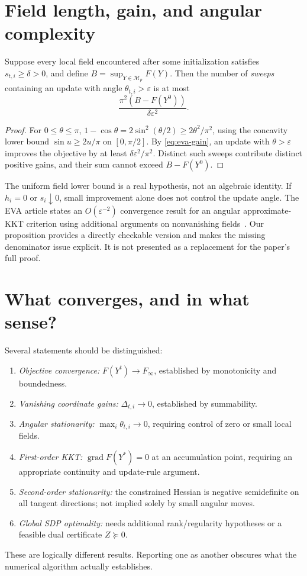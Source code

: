 \section{Field length, gain, and angular complexity}
\begin{proposition}\label{prop:conditional-rate}
Suppose every local field encountered after some initialization satisfies $s_{t,i}\ge\delta>0$, and define $B=\sup_{Y\in\mathcal M_p}F(Y)$. Then the number of \emph{sweeps} containing an update with angle $\theta_{t,i}>\varepsilon$ is at most
\[
\frac{\pi^2(B-F(Y^0))}{\delta\varepsilon^2}.
\]
\end{proposition}
\begin{proof}
For $0\le\theta\le\pi$, $1-\cos\theta=2\sin^2(\theta/2)\ge2\theta^2/\pi^2$, using the concavity lower bound $\sin u\ge2u/\pi$ on $[0,\pi/2]$. By \eqref{eq:eva-gain}, an update with $\theta>\varepsilon$ improves the objective by at least $\delta\varepsilon^2/\pi^2$. Distinct such sweeps contribute distinct positive gains, and their sum cannot exceed $B-F(Y^0)$.
\end{proof}

\begin{caution}
The uniform field lower bound is a real hypothesis, not an algebraic identity. If $h_i=0$ or $s_i\downarrow0$, small improvement alone does not control the update angle. The EVA article states an $O(\varepsilon^{-2})$ convergence result for an angular approximate-KKT criterion using additional arguments on nonvanishing fields~\cite{eva2026}. Our proposition provides a directly checkable version and makes the missing denominator issue explicit. It is not presented as a replacement for the paper's full proof.
\end{caution}

\section{What converges, and in what sense?}
Several statements should be distinguished:
\begin{enumerate}
\item \emph{Objective convergence:} $F(Y^t)\to F_\infty$, established by monotonicity and boundedness.
\item \emph{Vanishing coordinate gains:} $\Delta_{t,i}\to0$, established by summability.
\item \emph{Angular stationarity:} $\max_i\theta_{t,i}\to0$, requiring control of zero or small local fields.
\item \emph{First-order KKT:} $\operatorname{grad}F(Y^*)=0$ at an accumulation point, requiring an appropriate continuity and update-rule argument.
\item \emph{Second-order stationarity:} the constrained Hessian is negative semidefinite on all tangent directions; not implied solely by small angular moves.
\item \emph{Global SDP optimality:} needs additional rank/regularity hypotheses or a feasible dual certificate $Z\succeq0$.
\end{enumerate}
These are logically different results. Reporting one as another obscures what the numerical algorithm actually establishes.


